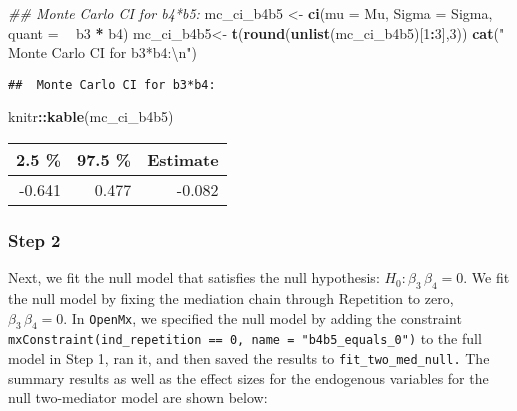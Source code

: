 \documentclass[11pt,]{article}
\newenvironment{Shaded}{\begin{snugshade}}{\end{snugshade}}
\newcommand{\CharTok}[1]{\textcolor[rgb]{0.31,0.60,0.02}{#1}}
\newcommand{\CommentTok}[1]{\textcolor[rgb]{0.56,0.35,0.01}{\textit{#1}}}
\newcommand{\DataTypeTok}[1]{\textcolor[rgb]{0.13,0.29,0.53}{#1}}
\newcommand{\DecValTok}[1]{\textcolor[rgb]{0.00,0.00,0.81}{#1}}
\newcommand{\KeywordTok}[1]{\textcolor[rgb]{0.13,0.29,0.53}{\textbf{#1}}}
\newcommand{\NormalTok}[1]{#1}
\newcommand{\OperatorTok}[1]{\textcolor[rgb]{0.81,0.36,0.00}{\textbf{#1}}}
\newcommand{\StringTok}[1]{\textcolor[rgb]{0.31,0.60,0.02}{#1}}
\begin{document}
\begin{Shaded}
\begin{Highlighting}[]
\CommentTok{## Monte Carlo CI for b4*b5:}
\NormalTok{mc_ci_b4b5 <-}\StringTok{ }\KeywordTok{ci}\NormalTok{(}\DataTypeTok{mu =}\NormalTok{ Mu,}
             \DataTypeTok{Sigma =}\NormalTok{ Sigma,}
             \DataTypeTok{quant =} \OperatorTok{~}\StringTok{ }\NormalTok{b3 }\OperatorTok{*}\StringTok{ }\NormalTok{b4)}
\NormalTok{mc_ci_b4b5<-}\StringTok{ }\KeywordTok{t}\NormalTok{(}\KeywordTok{round}\NormalTok{(}\KeywordTok{unlist}\NormalTok{(mc_ci_b4b5)[}\DecValTok{1}\OperatorTok{:}\DecValTok{3}\NormalTok{],}\DecValTok{3}\NormalTok{))}
\KeywordTok{cat}\NormalTok{(}\StringTok{" Monte Carlo CI for b3*b4:}\CharTok{\textbackslash{}n}\StringTok{"}\NormalTok{)}
\end{Highlighting}
\end{Shaded}

\begin{verbatim}
##  Monte Carlo CI for b3*b4:
\end{verbatim}

\begin{Shaded}
\begin{Highlighting}[]
\NormalTok{knitr}\OperatorTok{::}\KeywordTok{kable}\NormalTok{(mc_ci_b4b5)}
\end{Highlighting}
\end{Shaded}

\begin{longtable}[]{@{}rrr@{}}
\toprule
2.5 \% & 97.5 \% & Estimate\tabularnewline
\midrule
\endhead
-0.641 & 0.477 & -0.082\tabularnewline
\bottomrule
\end{longtable}

\hypertarget{step-2-1}{%
\subsubsection{Step 2}\label{step-2-1}}

Next, we fit the null model that satisfies the null hypothesis:
\(H_0: \beta_3 \, \beta_4 =0\). We fit the null model by fixing the
mediation chain through Repetition to zero, \(\beta_3 \, \beta_4 =0\).
In \texttt{OpenMx}, we specified the null model by adding the constraint
\texttt{mxConstraint(ind\_repetition\ ==\ 0,\ name\ =\ "b4b5\_equals\_0")}
to the full model in Step 1, ran it, and then saved the results to
\texttt{fit\_two\_med\_null.} The summary results as well as the effect
sizes for the endogenous variables for the null two-mediator model are
shown below:
\end{document}
